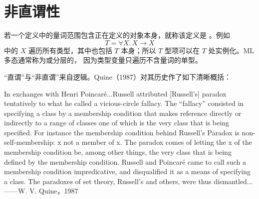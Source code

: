\section{非直谓性}
\label{sec:23.10}

若一个定义中的量词范围包含正在定义的对象本身，就称该定义是
。例如
\[
T=\forall X.\,X\to X
\]
中的 \(X\) 遍历所有类型，其中也包括 \(T\) 本身；所以 \(T\) 型项可以在
\(T\) 处实例化。ML 多态通常称为或分层的，
因为类型变量只遍历不含量词的单型。

“直谓”与“非直谓”来自逻辑。Quine（1987）对其历史作了如下清晰概括：

  {In exchanges with Henri Poincaré...Russell attributed [Russell's]
  paradox tentatively to what he called a vicious-circle fallacy. The
  ``fallacy'' consisted in specifying a class by a membership condition that
  makes reference directly or indirectly to a range of classes one of which
  is the very class that is being specified. For instance the membership
  condition behind Russell's Paradox is non-self-membership: x not a member
  of x. The paradox comes of letting the x of the membership condition be,
  among other things, the very class that is being defined by the membership
  condition. Russell and Poincaré came to call such a membership condition
  impredicative, and disqualified it as a means of specifying a class. The
  paradoxes of set theory, Russell's and others, were thus dismantled...}
  {——W. V. Quine，1987}

